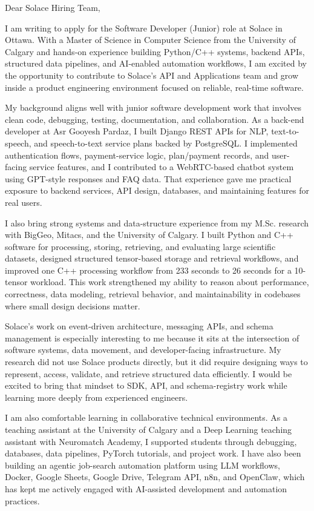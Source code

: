 \documentclass[11pt]{letter}
\begin{document}
\begin{letter}{}

\opening{Dear Solace Hiring Team,}

I am writing to apply for the Software Developer (Junior) role at Solace in Ottawa. With a Master of Science in Computer Science from the University of Calgary and hands-on experience building Python/C++ systems, backend APIs, structured data pipelines, and AI-enabled automation workflows, I am excited by the opportunity to contribute to Solace's API and Applications team and grow inside a product engineering environment focused on reliable, real-time software.

My background aligns well with junior software development work that involves clean code, debugging, testing, documentation, and collaboration. As a back-end developer at Asr Gooyesh Pardaz, I built Django REST APIs for NLP, text-to-speech, and speech-to-text service plans backed by PostgreSQL. I implemented authentication flows, payment-service logic, plan/payment records, and user-facing service features, and I contributed to a WebRTC-based chatbot system using GPT-style responses and FAQ data. That experience gave me practical exposure to backend services, API design, databases, and maintaining features for real users.

I also bring strong systems and data-structure experience from my M.Sc. research with BigGeo, Mitacs, and the University of Calgary. I built Python and C++ software for processing, storing, retrieving, and evaluating large scientific datasets, designed structured tensor-based storage and retrieval workflows, and improved one C++ processing workflow from 233 seconds to 26 seconds for a 10-tensor workload. This work strengthened my ability to reason about performance, correctness, data modeling, retrieval behavior, and maintainability in codebases where small design decisions matter.

Solace's work on event-driven architecture, messaging APIs, and schema management is especially interesting to me because it sits at the intersection of software systems, data movement, and developer-facing infrastructure. My research did not use Solace products directly, but it did require designing ways to represent, access, validate, and retrieve structured data efficiently. I would be excited to bring that mindset to SDK, API, and schema-registry work while learning more deeply from experienced engineers.

I am also comfortable learning in collaborative technical environments. As a teaching assistant at the University of Calgary and a Deep Learning teaching assistant with Neuromatch Academy, I supported students through debugging, databases, data pipelines, PyTorch tutorials, and project work. I have also been building an agentic job-search automation platform using LLM workflows, Docker, Google Sheets, Google Drive, Telegram API, n8n, and OpenClaw, which has kept me actively engaged with AI-assisted development and automation practices.


\end{letter}
\end{document}
